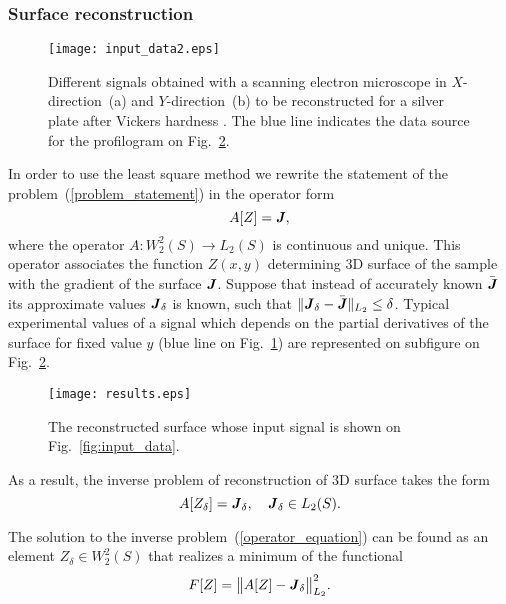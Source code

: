 \documentclass{beamer}
\begin{document}
\begin{frame}[allowframebreaks]
    \frametitle{Surface reconstruction}

    \begin{figure}
        \texttt{[image: input\_data2.eps]}
        \caption{Different signals obtained with a scanning electron microscope in $X$-direction~(a) and $Y$-direction~(b) to be reconstructed for a silver plate after Vickers hardness . The blue line indicates the data source for the profilogram on Fig.~\ref{fig:results}.}
        {\label{fig:input_data2}}%
    \end{figure}

    In order to use the least square method we rewrite the statement of the problem~(\ref{problem_statement}) in the operator form
    \begin{equation*}
        \label{operator_equation_0}
        A[Z] = {\textbf{\emph{J}}},
    \end{equation*}
    where the operator $A: W_2^2(S) \to L_2(S)$ is continuous and unique. This operator associates
    the function $Z(x,y)$ determining 3D surface of the sample with the gradient of the surface
    ${\textbf{\emph{J}}}$. Suppose that instead of accurately known $\bar{{\textbf{\emph{J}}}}$
    its approximate values ${\textbf{\emph{J}}}_\delta$ is known, such that
    $\|{\textbf{\emph{J}}}_\delta-\bar{{\textbf{\emph{J}}}}\|_{L_2}\leq\delta$. Typical experimental
    values of a signal which depends on the partial derivatives of the surface for fixed value $y$
    (blue line on Fig.~\ref{fig:input_data2}) are represented on subfigure on Fig.~\ref{fig:results}.

    \begin{figure}[t]
        \texttt{[image: results.eps]}
        \caption{The reconstructed surface whose input signal is shown on  Fig.~\ref{fig:input_data}.}
        {\label{fig:results}}
    \end{figure}

    As a result, the inverse problem of reconstruction of 3D surface takes the form
    \begin{equation}
        \label{operator_equation}
        A[Z_\delta] = {\textbf{\emph{J}}}_\delta, \quad {\textbf{\emph{J}}}_\delta \in L_2(S).
    \end{equation}


    The solution to the inverse problem~(\ref{operator_equation}) can be found as an element $Z_\delta \in W_2^2(S)$ that realizes a minimum of the functional
    \begin{equation}
        \label{functional}
        F[Z] = \big\|A[Z] - {\textbf{\emph{J}}}_\delta\big\|_{L_2}^2.
    \end{equation}
\end{frame}
\end{document}
